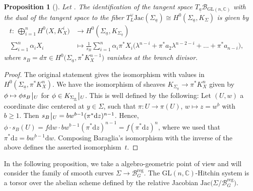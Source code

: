 \documentclass[pdftex]{sigma}
\numberwithin{equation}{section}
\newtheorem{prop}[theo]{Proposition}
\theoremstyle{definition}
\newcommand{\reg}{\mathrm{reg}}
\newcommand{\Jac}{\mathrm{Jac}}
\newcommand{\rest}{\: \rule[-3.5pt]{0.5pt}{11.5pt}\,{}}
\renewcommand{\to}{\rightarrow}
\newcommand{\calB}{\mathcal{B}}
\newcommand{\CC}{\mathbb{C}}
\renewcommand{\d}{\mathrm{d}}
\newcommand{\GL}{\mathrm{GL}}
\begin{document}
\begin{prop}[{\cite[Proposition~3.4]{Baraglia}}]\label{prop:Baraglia}
 Let \smash{$\underline{a} \in \calB_{\GL(n,\CC)}^\reg$}. The identification of the tangent space $T_{\underline{a}}\calB_{\GL(n,\CC)}$ with the dual of the tangent space to the fiber $T^\vee_L\Jac(\Sigma_{\underline{a}}) \cong H^0(\Sigma_{\underline{a}},K_\Sigma)$ is given by
 \begin{align*}
 t\colon \ \bigoplus\limits_{i=1}^n H^0\bigl(X,K_X^i\bigr) & \to H^0(\Sigma_{\underline{a}},K_{\Sigma_{\underline{a}}})
 \\
\sum\limits_{i=1}^n \alpha_i X_i & \mapsto \frac{1}{s_B} \sum\limits_{i=1}^n \alpha_i \pi^*X_i\bigl(\lambda^{n-i}+\pi^*a_2 \lambda^{n-2-i}+ \dots + \pi^*a_{n-i}\bigr),
 \end{align*}
 where $s_B=d \pi \in H^0\bigl(\Sigma_{\underline{a}},\pi^*K_X^{n-1}\bigr)$ vanishes at the branch divisor.
\end{prop}
\begin{proof}
 The original statement gives the isomorphism with values in $H^0(\Sigma_{\underline{a}},\pi^*K_X^n)$. We have the isomorphism of sheaves $K_{\Sigma_{\underline{a}}} \to \pi^*K_X^n$ given by $ \phi \mapsto \phi s_B\rest_U$ for $\phi \in K_{\Sigma_{\underline{a}}}\rest_U$. This is well defined by the following: Let $(U,w)$ a coordinate disc centered at $y \in \Sigma$, such that $\pi\colon U \to \pi(U)$, $w \mapsto z=w^b$ with $b \geq 1$. Then $s_B\rest_U= b w^{b-1} (\pi^* \d z)^{n-1}$. Hence, $\phi \cdot s_B(U)=f \d w \cdot b w^{b-1} (\pi^* \d z)^{n-1}=f (\pi^* \d z)^{n}$, where we used that $\pi^* \d z= b w^{b-1} \d w$. Composing Baraglia's isomorphism \cite[Proposition~3.4]{Baraglia} with the inverse of the above defines the asserted isomorphism~$t$.
\end{proof}

In the following proposition, we take a algebro-geometric point of view and will consider the family of smooth curves $\Sigma \to \calB_G^\reg$. The $\GL(n,\CC)$-Hitchin system is a torsor over the abelian scheme defined by the relative Jacobian $\Jac\bigl(\Sigma/\calB_G^\reg\bigr)$.
\end{document}
